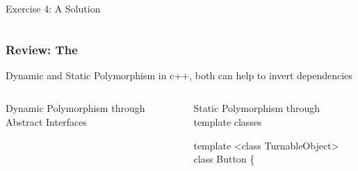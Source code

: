 \documentclass[9pt]{beamer}
\begin{document}
\begin{frame}
\begin{exampleblock}{Exercise 4: A Solution}
\begin{columns}[t]
  \end{columns}
  
\end{exampleblock}
\end{frame}

\begin{frame}[fragile]
  \frametitle{Review: The \secname}
\vfill
\begin{block}{Dynamic and Static Polymorphism}
\small
in c++, both can help to invert dependencies\\
\begin{columns}[t]

    \begin{column}{.45\textwidth}
       \begin{block}{Dynamic Polymorphism through Abstract Interfaces}

          \begin{center}
          \end{center}
       \end{block}
    \end{column}
\pause
    \begin{column}{.45\textwidth}
       \begin{block}{Static Polymorphism through template classes}

          \begin{center}
            \scriptsize
              \begin{semiverbatim}
template <class TurnableObject>
class Button \{


\end{semiverbatim}
\end{center}
\end{block}
\end{column}
\end{columns}
\end{block}
\end{frame}
\end{document}
